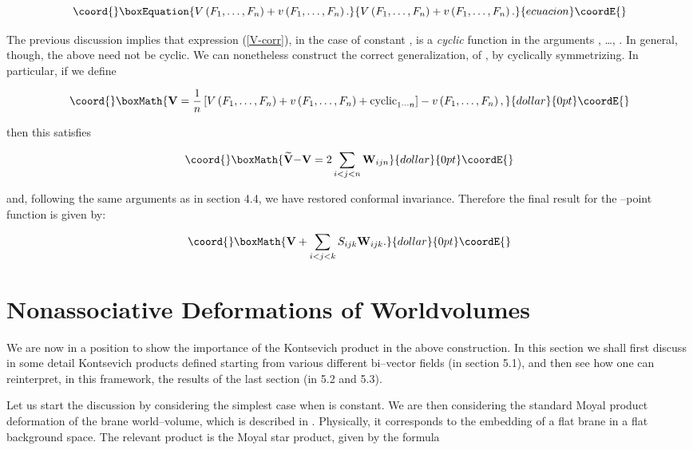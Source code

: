 \documentclass[a4paper,11pt]{article}
\providecommand{\frak}[1]{{\bf{#1}}}
\begin{document}
\begin{equation}\coord{}\boxEquation{
V\left( F_{1}, \dots, F_{n}\right) +v\left( F_{1}, \dots, F_{n}\right) .
\label{V-corr}
}{
V\left( F_{1}, \dots, F_{n}\right) +v\left( F_{1}, \dots, F_{n}\right) .
}{ecuacion}\coordE{}\end{equation}

\noindent
The previous discussion implies that expression (\ref{V-corr}), in the case
of constant \coordHE{}, is a \textit{cyclic} 
function in the arguments \coordHE{}, \dots, \coordHE{}. In general, though, the
above need not be cyclic. We can nonetheless construct the correct
generalization, \myHighlight{$\frak{V}$}\coordHE{} of \coordHE{}, by
cyclically symmetrizing. In particular, if we define

$$\coord{}\boxMath{
\frak{V}=\frac{1}{n}\left[ V\left( F_{1},\dots,F_{n} \right) +v\left(
F_{1},\dots,F_{n} \right) +\mathrm{cyclic}_{1\cdots n}\right] -v\left(
F_{1},\dots,F_{n} \right) ,
}{dollar}{0pt}\coordE{}$$

\noindent
then this satisfies

$$\coord{}\boxMath{
\widetilde{\frak{V}}\frak{-V}=2\sum_{i<j<n}\frak{W}_{ijn}
}{dollar}{0pt}\coordE{}$$

\noindent
and, following the same arguments as in section 4.4, we have restored
conformal invariance. Therefore the final result for the \coordHE{}--point function
is given by:

$$\coord{}\boxMath{
\frak{V}+\sum_{i<j<k}S_{ijk}\frak{W}_{ijk}.
}{dollar}{0pt}\coordE{}$$


\section{Nonassociative Deformations of Worldvolumes}


We are now in a position to show the importance of the Kontsevich product
\myHighlight{$\bullet$}\coordHE{} in the above construction. In this section we shall first discuss
in some detail Kontsevich products defined starting from various different
bi--vector fields (in section 5.1), and then see how one can reinterpret,
in this framework, the results of the last section (in 5.2 and 5.3).

Let us start the discussion by considering the simplest case when \coordHE{} is constant. We are then considering the standard Moyal product
deformation of the brane world--volume, which is described in \cite
{Schomerus, Seiberg-Witten}. Physically, it corresponds to the embedding of
a flat brane in a flat background space. The relevant product is the Moyal
star product, given by the formula
\end{document}
